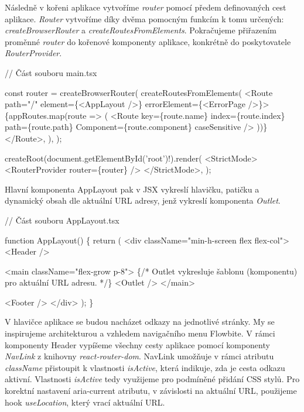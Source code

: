 Následně v kořeni aplikace vytvoříme \emph{router} pomocí předem definovaných cest aplikace. 
\emph{Router} vytvoříme díky dvěma pomocným funkcím k tomu určených: \emph{createBrowserRouter} a \emph{createRoutesFromElements}. 
Pokračujeme přiřazením proměnné \emph{router} do kořenové komponenty aplikace, konkrétně do poskytovatele \emph{RouterProvider}.

\begin{prog}
// Část souboru main.tsx

const router = createBrowserRouter(
  createRoutesFromElements(
    <Route path="/" element=\{<AppLayout />\} errorElement=\{<ErrorPage />\}>
      \{appRoutes.map(route => (
        <Route
          key=\{route.name\}
          index=\{route.index\}
          path=\{route.path\}
          Component=\{route.component\}
          caseSensitive
        />
      ))\}
    </Route>,
  ),
);

createRoot(document.getElementById('root')!).render(
  <StrictMode>
    <RouterProvider router=\{router\} />
  </StrictMode>,
);
\end{prog}

Hlavní komponenta AppLayout pak v JSX vykreslí hlavičku, patičku a dynamický obsah dle aktuální URL adresy, jenž vykreslí komponenta \emph{Outlet}.

\begin{prog}
// Část souboru AppLayout.tsx

function AppLayout() \{
  return (
    <div className="min-h-screen flex flex-col">
      <Header />

      <main className="flex-grow p-8">
        \{/* Outlet vykresluje šablonu (komponentu) pro aktuální URL adresu. */\}
        <Outlet />
      </main>

      <Footer />
    </div>
  );
\}
\end{prog}

V hlavičce aplikace se budou nacházet odkazy na jednotlivé stránky. My se inspirujeme architekturou a vzhledem navigačního menu Flowbite. 
V rámci komponenty Header vypíšeme všechny cesty aplikace pomocí komponenty \emph{NavLink} z knihovny \emph{react-router-dom}. NavLink umožňuje v rámci atributu \emph{className} přistoupit k vlastnosti \emph{isActive}, která indikuje, zda je cesta odkazu aktivní. 
Vlastnosti \emph{isActive} tedy využijeme pro podmíněné přidání CSS stylů. Pro korektní nastavení aria-current atributu, v závislosti na aktuální URL, použijeme hook \emph{useLocation}, který vrací aktuální URL.


